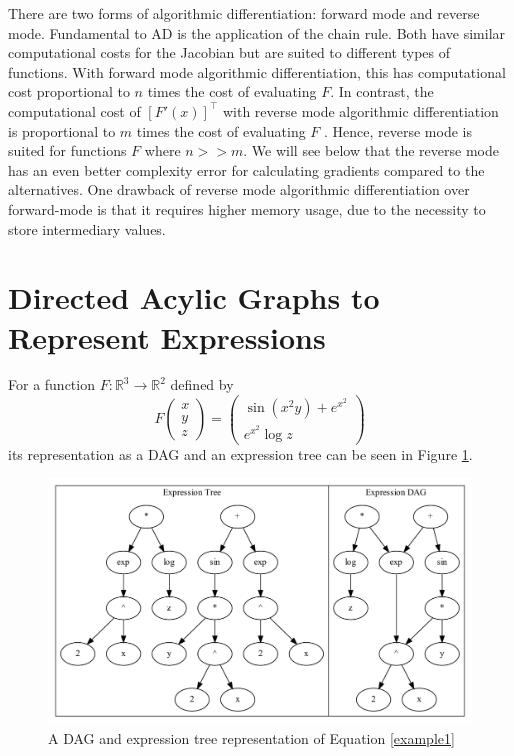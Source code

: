 \documentclass{article}
\begin{document}
There are two forms of algorithmic differentiation: forward mode and reverse mode. Fundamental to AD is the application of the chain rule. Both have similar computational costs for the Jacobian but are suited to different types of functions. With forward mode algorithmic differentiation, this has computational cost proportional to $n$ times the cost of evaluating $F$. In contrast, the computational cost of $[F'(x)]^\top$ with reverse mode algorithmic differentiation is proportional to $m$ times the cost of evaluating $F$ \cite{falisse}. Hence, reverse mode is suited for functions $F$ where $n >> m$. We will see below that the reverse mode has an even better complexity error for calculating gradients compared to the alternatives. One drawback of reverse mode algorithmic differentiation over forward-mode is that it requires higher memory usage, due to the necessity to store intermediary values.

\section{Directed Acylic Graphs to Represent Expressions}

For a function $F: \mathbb{R}^3 \rightarrow \mathbb{R}^2$ defined by
\begin{equation} \label{example1}
    F \begin{pmatrix}
        x \\ y \\ z
    \end{pmatrix} = \begin{pmatrix}
        \sin (x^2 y) + e^{x^2} \\ e^{x^2} \log z
    \end{pmatrix}
\end{equation}
its representation as a DAG and an expression tree can be seen in Figure \ref{fig:DAGgraph2}.

\begin{figure}[h]
    \centering
    \includegraphics[width=12cm]{images/Graph_Cluster_1.pdf}
    \caption{A DAG and expression tree representation of Equation \ref{example1}}
    \label{fig:DAGgraph2}
\end{figure}
\end{document}
